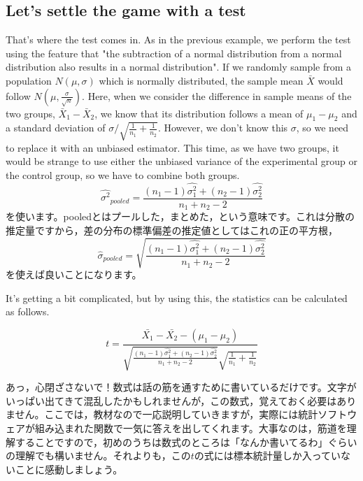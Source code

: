 \documentclass{ltjsarticle}
\begin{document}
{\subsection{Let's settle the game with a test}
That's where the test comes in. As in the previous example, we perform the test using the feature that "the subtraction of a normal distribution from a normal distribution also results in a normal distribution". If we randomly sample from a population $N(\mu, \sigma)$ which is normally distributed, the sample mean $\bar{X}$ would follow $N(\mu, \frac{\sigma}{\sqrt{n}})$. Here, when we consider the difference in sample means of the two groups, $\bar{X}_1 - \bar{X}_2$, we know that its distribution follows a mean of $\mu_1 - \mu_2$ and a standard deviation of $\sigma/ \sqrt{\frac{1}{n_1} + \frac{1}{n_2}}$. However, we don't know this $\sigma$, so we need to replace it with an unbiased estimator. This time, as we have two groups, it would be strange to use either the unbiased variance of the experimental group or the control group, so we have to combine both groups.
\[ \hat{\sigma^2}_{pooled} = \frac{(n_1-1)\hat{\sigma_1^2}+(n_2-1)\hat{\sigma_2^2}}{n_1+n_2 - 2}\]
を使います。pooledとはプールした，まとめた，という意味です。これは分散の推定量ですから，差の分布の標準偏差の推定値としてはこれの正の平方根，
\[ \hat{\sigma}_{pooled} = \sqrt{\frac{(n_1-1)\hat{\sigma_1^2}+(n_2-1)\hat{\sigma_2^2}}{n_1+n_2 - 2}}\]を使えば良いことになります。

It's getting a bit complicated, but by using this, the statistics can be calculated as follows.

\[ t = \frac{\bar{X_1}-\bar{X_2}-(\mu_1-\mu_2)}{\sqrt{\frac{(n_1-1)\hat{\sigma_1^2}+(n_2-1)\hat{\sigma_2^2}}{n_1+n_2 - 2}}\sqrt{\frac{1}{n_1}+\frac{1}{n_2}}}\]

あっ，心閉ざさないで！数式は話の筋を通すために書いているだけです。文字がいっぱい出てきて混乱したかもしれませんが，この数式，覚えておく必要はありません。ここでは，教材なので一応説明していきますが，実際には統計ソフトウェアが組み込まれた関数で一気に答えを出してくれます。大事なのは，筋道を理解することですので，初めのうちは数式のところは「なんか書いてるわ」ぐらいの理解でも構いません。それよりも，この$t$の式には標本統計量しか入っていないことに感動しましょう。

}
\end{document}
